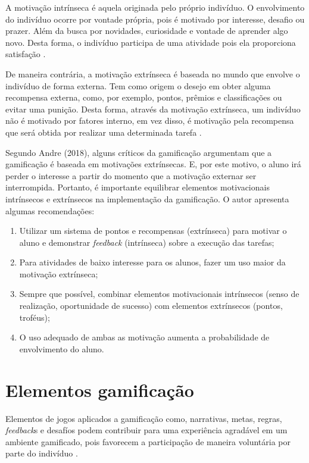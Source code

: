 \documentclass[
	12pt,				%
	oneside,			%
	a4paper,			%
	english,			%
	french,				%
	spanish,			%
	brazil,				%
	]{abntex2}
\begin{document}
A motivação intrínseca é aquela originada pelo próprio indivíduo. O envolvimento do indivíduo ocorre por vontade própria,  pois é motivado por interesse, desafio ou prazer. Além da busca por novidades, curiosidade e vontade de aprender algo novo. Desta forma, o indivíduo participa de uma atividade pois ela proporciona satisfação \cite{busarello2016gamificaccao}.

De maneira contrária, a motivação extrínseca é baseada no mundo que envolve o indivíduo de forma externa. Tem como origem o desejo em obter alguma recompensa externa, como, por exemplo, pontos, prêmios e classificações ou evitar uma punição. Desta forma, através da motivação extrínseca, um indivíduo não é motivado por fatores interno, em vez disso, é motivação pela recompensa que será obtida por realizar uma determinada tarefa \cite{busarello2016gamificaccao}.

Segundo Andre (2018), alguns críticos da gamificação argumentam que a gamificação é baseada em motivações extrínsecas. E, por este motivo, o aluno irá perder o interesse a partir do momento que a motivação externar ser interrompida. Portanto, é importante equilibrar elementos motivacionais intrínsecos e extrínsecos na implementação da gamificação. O autor apresenta algumas recomendações:

\begin{enumerate}
\item Utilizar um sistema de pontos e recompensas (extrínseca) para motivar o aluno e demonstrar \textit{feedback} (intrínseca) sobre a execução das tarefas;
\item Para atividades de baixo interesse para os alunos, fazer um uso maior da motivação extrínseca;
\item Sempre que possível, combinar elementos motivacionais intrínsecos (senso de realização, oportunidade de sucesso) com elementos extrínsecos (pontos, troféus);
\item O uso adequado de ambas as motivação aumenta a probabilidade de envolvimento do aluno.
\end{enumerate}
  
\section{Elementos gamificação}

Elementos de jogos aplicados a gamificação como, narrativas, metas, regras, \textit{feedback}s e desafíos podem contribuir para uma experiência agradável em um ambiente gamificado, pois favorecem a participação de maneira voluntária por parte do indivíduo \cite{busarello2016gamificaccao}.
\end{document}
